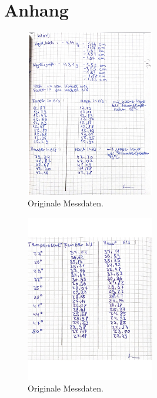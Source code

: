 \section{Anhang}
\label{sec:Anhang}

\begin{figure}[H]
    \centering
    \includegraphics[width=0.5\textwidth]{Dateien/V107daten1.jpg}
    \caption{Originale Messdaten.}
    \label{fig:origDaten1}
\end{figure}
\begin{figure}[H]
    \centering
    \includegraphics[width=0.5\textwidth]{Dateien/V107daten2.jpg}
    \caption{Originale Messdaten.}
    \label{fig:origDaten2}
\end{figure}